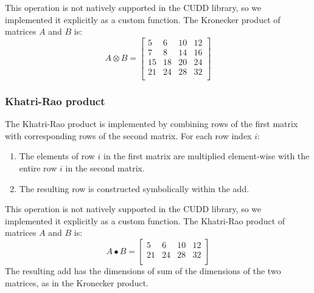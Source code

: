 This operation is not natively supported in the CUDD library, so we implemented it explicitly as a custom function. 
The Kronecker product of matrices $A$ and $B$ is:
\[
    A \otimes B = \begin{bmatrix}
        5  & 6  & 10 & 12 \\
        7  & 8  & 14 & 16 \\
        15 & 18 & 20 & 24 \\
        21 & 24 & 28 & 32 \\
    \end{bmatrix}
\]

\subsubsection{Khatri-Rao product}
The Khatri-Rao product is implemented by combining rows of the first matrix with corresponding rows of the second matrix. For each row index $i$:
\begin{enumerate}
    \item The elements of row $i$ in the first matrix are multiplied element-wise with the entire row $i$ in the second matrix.
    \item The resulting row is constructed symbolically within the \gls{add}.   
\end{enumerate}
This operation is not natively supported in the CUDD library, so we implemented it explicitly as a custom function.
The Khatri-Rao product of matrices $A$ and $B$ is:
\[
    A \bullet B = \begin{bmatrix}
        5  & 6  & 10 & 12 \\
        21 & 24 & 28 & 32 \\
    \end{bmatrix}
\]
The resulting \gls{add} has the dimensions of sum of the dimensions of the two matrices, as in the Kronecker product.


